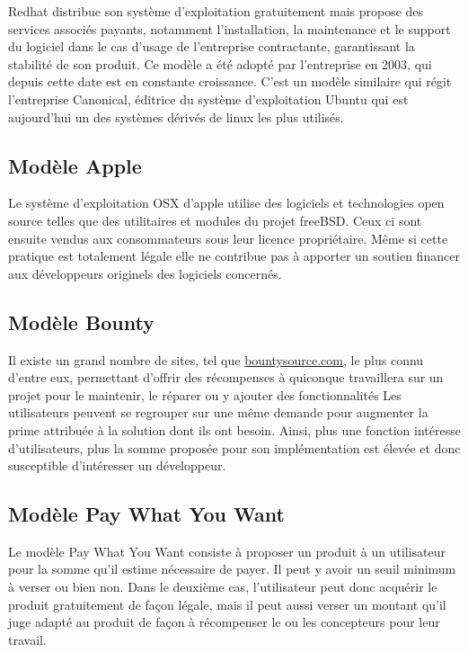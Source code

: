 Redhat distribue son système d'exploitation gratuitement mais propose des
services associés payants, notamment l'installation, la maintenance et le
support du logiciel dans le cas d'usage de l'entreprise contractante,
garantissant la stabilité de son produit.
Ce modèle a été adopté par l'entreprise en 2003, qui depuis cette date est en
constante croissance.
C'est un modèle similaire qui régit l'entreprise Canonical, éditrice du
système d'exploitation Ubuntu qui est aujourd'hui un des systèmes dérivés de
linux les plus utilisés.

    \subsection{Modèle Apple}

Le système d'exploitation OSX d'apple utilise des logiciels et technologies
open source telles que des utilitaires et modules du projet freeBSD\@.
Ceux ci sont ensuite vendus aux consommateurs sous leur licence propriétaire.
Même si cette pratique est totalement légale elle ne contribue pas à apporter
un soutien financer aux développeurs originels des logiciels concernés.

    \subsection{Modèle Bounty}

Il existe un grand nombre de sites, tel que \url{bountysource.com}, le
plus connu d'entre eux, permettant d'offrir des récompenses à quiconque
travaillera sur un projet pour le maintenir, le réparer ou y ajouter des
fonctionnalités
Les utilisateurs peuvent se regrouper sur une même demande pour augmenter la
prime attribuée à la solution dont ils ont besoin.
Ainsi, plus une fonction intéresse d'utilisateurs, plus la somme proposée pour
son implémentation est élevée et donc susceptible d'intéresser un développeur.

    \subsection{Modèle Pay What You Want}

Le modèle Pay What You Want consiste à proposer un produit à un utilisateur
pour la somme qu'il estime nécessaire de payer. Il peut y avoir un seuil
minimum à verser ou bien non. Dans le deuxième cas, l'utilisateur peut donc
acquérir le produit gratuitement de façon légale, mais il peut aussi verser un
montant qu'il juge adapté au produit de façon à récompenser le ou les
concepteurs pour leur travail.

